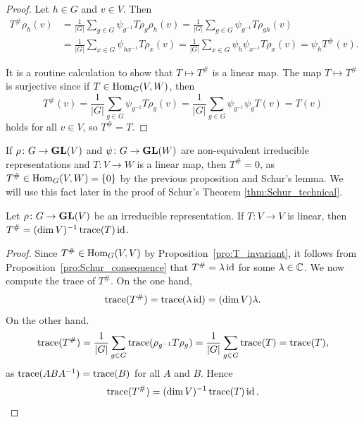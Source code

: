 \begin{proof}
  Let $h\in G$ and $v\in V$. Then 
  \begin{align*}
	T^{\#}\rho_h(v)
	&=\frac{1}{|G|}\sum_{g\in G}\psi_{g^{-1}}T\rho_g\rho_h(v)
	=\frac{1}{|G|}\sum_{g\in G}\psi_{g^{-1}}T\rho_{gh}(v)\\
	&=\frac{1}{|G|}\sum_{x\in G}\psi_{hx^{-1}}T\rho_x(v)
	=\frac{1}{|G|}\sum_{x\in G}\psi_h\psi_{x^{-1}}T\rho_x(v)
	=\psi_hT^{\#}(v).
      \end{align*}

    It is a routine calculation to show that $T\mapsto T^{\#}$ is a linear map. The map
    $T\mapsto T^{\#}$ is surjective since 
    if $T\in\operatorname{Hom}_G(V,W)$, then  
	\[
	T^{\#}(v)=\frac{1}{|G|}\sum_{g\in G}\psi_{g^{-1}}T\rho_g(v)
	=\frac{1}{|G|}\sum_{g\in G}\psi_{g^{-1}}\psi_gT(v)
	=T(v)
      \]
    holds for all $v\in V$, so $T^{\#}=T$.  
\end{proof}

If $\rho\colon G\to\mathbf{GL}(V)$ and $\psi\colon
	G\to\mathbf{GL}(W)$ are non-equivalent irreducible representations and $T\colon
	V\to W$ is a linear map, then $T^{\#}=0$, as 
	$T^{\#}\in\operatorname{Hom}_{G}(V,W)=\{0\}$ by the previous proposition and Schur's lemma. We will use this
 fact later in the proof of Schur's Theorem  \ref{thm:Schur_technical}. 

\begin{theorem}
\label{thm:ergodic}
  Let $\rho\colon G\to\mathbf{GL}(V)$ be an irreducible representation. 
  If $T\colon V\to V$ is linear, then 
  $T^{\#}=(\dim V)^{-1}\operatorname{trace}(T)\operatorname{id}$.
\end{theorem}

\begin{proof}
  Since $T^{\#}\in\operatorname{Hom}_G(V,V)$ by Proposition~\ref{pro:T_invariant}, it follows
  from Proposition~\ref{pro:Schur_consequence} that
  $T^{\#}=\lambda\operatorname{id}$ for some $\lambda\in\mathbb{C}$.
  We now compute the trace of $T^{\#}$. On the one hand, 
  \[
	\operatorname{trace}(T^{\#})=\operatorname{trace}(\lambda\operatorname{id})=(\dim V)\lambda.
  \]
  On the other hand.  
  \[
	\operatorname{trace}(T^{\#})
	=\frac{1}{|G|}\sum_{g\in G}\operatorname{trace}(\rho_{g^{-1}}T\rho_g)
	=\frac{1}{|G|}\sum_{g\in G}\operatorname{trace}(T)
	=\operatorname{trace}(T),
  \]
  as $\operatorname{trace}(ABA^{-1})=\operatorname{trace}(B)$ for all $A$ and $B$. 
  Hence 
  \[
  \operatorname{trace}(T^{\#})=(\dim V)^{-1}\operatorname{trace}(T)\operatorname{id}.\qedhere 
  \]
\end{proof}



